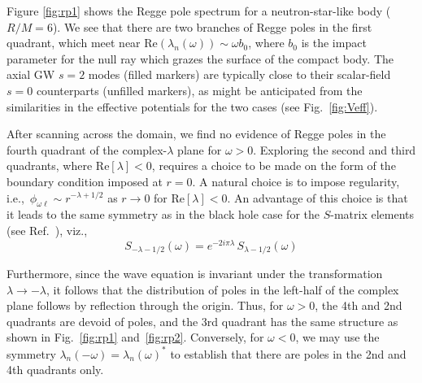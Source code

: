\documentclass[aps,prd,longbibliography,reprint,twocolumn,amsmath,amssymb,amsfonts,showpacs,footnote,superscriptaddress]{revtex4-1}%
\begin{document}
Figure \ref{fig:rp1} shows the Regge pole spectrum for a neutron-star-like body ($R/M = 6$). We see that there are two branches of Regge poles in the first quadrant, which meet near $\text{Re}( \lambda_n(\omega) ) \sim \omega b_0$, where $b_0$ is the impact parameter for the null ray which grazes the surface of the compact body. The axial GW $s=2$ modes (filled markers) are typically close to their scalar-field $s=0$ counterparts (unfilled markers), as might be anticipated from the similarities in the effective potentials for the two cases (see Fig.~\ref{fig:Veff}).

After scanning across the domain, we find no evidence of Regge poles in the fourth quadrant of the complex-$\lambda$ plane for $\omega>0$. Exploring the second and third quadrants, where $\text{Re}[{\lambda}] < 0$, requires a choice to be made on the form of the boundary condition imposed at $r=0$. A natural choice is to impose regularity, i.e.,~$\phi_{\omega\ell} \sim r^{-\lambda+1/2}$ as $r \rightarrow 0$ for $\text{Re} [\lambda] < 0$. An advantage of this choice is that it leads to the same symmetry as in the black hole case for the $S$-matrix elements (see Ref.~\cite{Andersson:1994rk,Folacci:2019cmc}), viz.,
\begin{equation}\label{Matrix_S_CAM_symm}
S_{-\lambda -1/2}(\omega) =  e^{-2i \pi \lambda} \, S_{\lambda -1/2}(\omega)
\end{equation}

Furthermore, since the wave equation is invariant under the transformation $\lambda \rightarrow -\lambda$, it follows that the distribution of poles in the left-half of the complex plane follows by reflection through the origin. Thus, for $\omega > 0$, the 4th and 2nd quadrants are devoid of poles, and the 3rd quadrant has the same structure as shown in Fig.~\ref{fig:rp1} and~\ref{fig:rp2}.
Conversely, for $\omega < 0$, we may use the symmetry $\lambda_n(-\omega) = \lambda_n(\omega)^*$ to establish that there are poles in the 2nd and 4th quadrants only.
\end{document}
